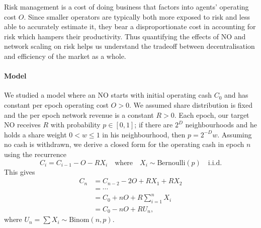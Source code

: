 Risk management is a cost of doing business that factors into agents' operating cost $O$.
%
Since smaller operators are typically both more exposed to risk and less able to accurately estimate it, they bear a disproportionate cost in accounting for risk which hampers their productivity.
%
Thus quantifying the effects of NO and network scaling on risk helps us understand the tradeoff between decentralisation and efficiency of the market as a whole.

\begin{comment}
\subsubsection*{Redistribution lottery structure}
 
A risk factor that is straightforwardly under the direct control of the system is the structure of the redistribution lottery.
%
Currently, in each epoch the full redistribution payout is awarded to a single NO with probability weighted by the number of bins and the NO share within the target bin.
%
Clearly, such an approach has higher variance than the expectation-equivalent deterministic system, which doles out a share of the payout weighted by the number of bins and bin share with probability $1$.

The random approach saves on computational costs by reducing the number of transfers that must be made in each epoch.
%
On the other hand, it introduces a risk of drawdowns and bankruptcy that especially affects smaller scale NOs, who may experience long strings of epochs without receiving any payout.
\end{comment}

\paragraph{Model}

We studied a model where an NO starts with initial operating cash $C_0$ and has constant per epoch operating cost $O>0$.
%
We assumed share distribution is fixed and the per epoch network revenue is a constant $R>0$.
%
Each epoch, our target NO receives $R$ with probability $p\in[0,1]$; if there are $2^D$ neighbourhoods and he holds a share weight $0<w\leq 1$ in his neighbourhood, then $p=2^{-D}w$.
%
Assuming no cash is withdrawn, we derive a closed form for the operating cash in epoch $n$ using the recurrence
%
\[
  C_i = C_{i-1} - O - RX_i \quad \text{where} \quad X_i \sim \mathrm{Bernoulli}(p) \quad \text{i.i.d.}
\]
This gives 
\begin{align*}
  C_n &= C_{n-2} - 2O + RX_1 + RX_2 \\
  & =\cdots \\
  &= C_0 + nO + R\sum_{i=1}^n X_i \\
  &= C_0 - nO + RU_n,
\end{align*}
where $U_n = \sum X_i \sim \mathrm{Binom}(n,p)$.

